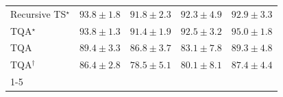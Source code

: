 \begin{tabular}{l|cccc|}
Recursive TS$^\star$ & {\cellcolor[HTML]{034D79}} \color[HTML]{F1F1F1} $93.8\pm 1.8$ & {\cellcolor[HTML]{04598C}} \color[HTML]{F1F1F1} $91.8\pm 2.3$ & {\cellcolor[HTML]{045687}} \color[HTML]{F1F1F1} $92.3\pm 4.9$ & {\cellcolor[HTML]{045382}} \color[HTML]{F1F1F1} $92.9\pm 3.3$ \\
TQA$^\star$ & {\cellcolor[HTML]{034D79}} \color[HTML]{F1F1F1} $93.8\pm 1.3$ & {\cellcolor[HTML]{045B8F}} \color[HTML]{F1F1F1} $91.4\pm 1.9$ & {\cellcolor[HTML]{045585}} \color[HTML]{F1F1F1} $92.5\pm 3.2$ & {\cellcolor[HTML]{03466E}} \color[HTML]{F1F1F1} $95.0\pm 1.8$ \\
TQA & {\cellcolor[HTML]{04639B}} \color[HTML]{F1F1F1} $89.4\pm 3.3$ & {\cellcolor[HTML]{056DAC}} \color[HTML]{F1F1F1} $86.8\pm 3.7$ & {\cellcolor[HTML]{2081B9}} \color[HTML]{F1F1F1} $83.1\pm 7.8$ & {\cellcolor[HTML]{04639B}} \color[HTML]{F1F1F1} $89.3\pm 4.8$ \\
TQA$^\dagger$ & {\cellcolor[HTML]{056FAE}} \color[HTML]{F1F1F1} $86.4\pm 2.8$ & {\cellcolor[HTML]{4C99C5}} \color[HTML]{F1F1F1} $78.5\pm 5.1$ & {\cellcolor[HTML]{3B92C1}} \color[HTML]{F1F1F1} $80.1\pm 8.1$ & {\cellcolor[HTML]{056BA7}} \color[HTML]{F1F1F1} $87.4\pm 4.4$ \\
\cline{1-5}
\bottomrule
\end{tabular}
